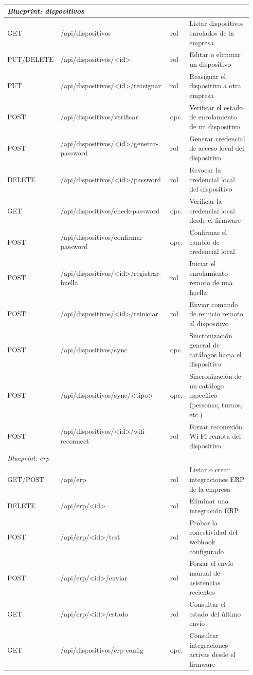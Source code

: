 \documentclass{iccmemoria}
\begin{document}
\begin{longtable}{|p{1.5cm}|p{5.2cm}|p{1.2cm}|p{5.3cm}|}
\multicolumn{4}{|l|}{\textit{Blueprint: dispositivos}} \\
\hline
GET & /api/dispositivos & rol & Listar dispositivos enrolados de la empresa \\
PUT/\allowbreak DELETE & /api/dispositivos/<id> & rol & Editar o eliminar un dispositivo \\
PUT & /api/\allowbreak dispositivos/\allowbreak <id>/\allowbreak reasignar & rol & Reasignar el dispositivo a otra empresa \\
POST & /api/\allowbreak dispositivos/\allowbreak verificar & opc. & Verificar el estado de enrolamiento de un dispositivo \\
POST & /api/\allowbreak dispositivos/\allowbreak <id>/\allowbreak generar-password & rol & Generar credencial de acceso local del dispositivo \\
DELETE & /api/\allowbreak dispositivos/\allowbreak <id>/\allowbreak password & rol & Revocar la credencial local del dispositivo \\
GET & /api/\allowbreak dispositivos/\allowbreak check-password & opc. & Verificar la credencial local desde el firmware \\
POST & /api/\allowbreak dispositivos/\allowbreak confirmar-password & opc. & Confirmar el cambio de credencial local \\
POST & /api/\allowbreak dispositivos/\allowbreak <id>/\allowbreak registrar-huella & rol & Iniciar el enrolamiento remoto de una huella \\
POST & /api/\allowbreak dispositivos/\allowbreak <id>/\allowbreak reiniciar & rol & Enviar comando de reinicio remoto al dispositivo \\
POST & /api/dispositivos/sync & opc. & Sincronización general de catálogos hacia el dispositivo \\
POST & /api/\allowbreak dispositivos/\allowbreak sync/\allowbreak <tipo> & opc. & Sincronización de un catálogo específico (personas, turnos, etc.) \\
POST & /api/\allowbreak dispositivos/\allowbreak <id>/\allowbreak wifi-reconnect & rol & Forzar reconexión Wi-Fi remota del dispositivo \\
\hline

\multicolumn{4}{|l|}{\textit{Blueprint: erp}} \\
\hline
GET/\allowbreak POST & /api/erp & rol & Listar o crear integraciones ERP de la empresa \\
DELETE & /api/erp/<id> & rol & Eliminar una integración ERP \\
POST & /api/erp/<id>/test & rol & Probar la conectividad del webhook configurado \\
POST & /api/erp/<id>/enviar & rol & Forzar el envío manual de asistencias recientes \\
GET & /api/erp/<id>/estado & rol & Consultar el estado del último envío \\
GET & /api/\allowbreak dispositivos/\allowbreak erp-config & opc. & Consultar integraciones activas desde el firmware \\
\hline


\end{longtable}
\end{document}
